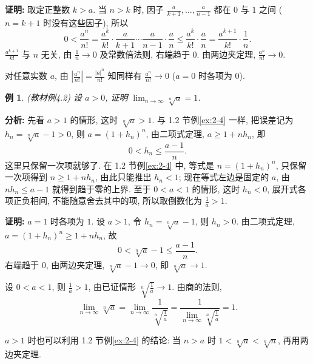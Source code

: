 \documentclass[UTF8,openany]{ctexbook}
\theoremstyle{chinesetextbook}
\newtheorem{example}{例}[section]
\newenvironment{cnproof}{\par\indent\textbf{证明:} \ignorespaces}{\par}
\begin{document}
\begin{cnproof}
取定正整数 $k>a$. 当 $n>k$ 时, 因子 $\displaystyle\frac a{k+1},\ldots,\frac a{n-1}$ 都在 $0$ 与 $1$ 之间 ($n=k+1$ 时没有这些因子), 所以
\[
0<\frac{a^n}{n!}=\frac{a^k}{k!}\cdot\frac a{k+1}\cdots\frac a{n-1}\cdot\frac an\le\frac{a^k}{k!}\cdot\frac an=\frac{a^{k+1}}{k!}\cdot\frac1n.
\]
$\displaystyle\frac{a^{k+1}}{k!}$ 与 $n$ 无关, 由 $\displaystyle\frac1n\to0$ 及常数倍法则, 右端趋于 $0$. 由两边夹定理, $\displaystyle\frac{a^n}{n!}\to0$.
\end{cnproof}
对任意实数 $a$, 由 $\displaystyle\left|\frac{a^n}{n!}\right|=\frac{|a|^n}{n!}$ 知同样有 $\displaystyle\frac{a^n}{n!}\to0$ ($a=0$ 时各项为 $0$).
\begin{example}\label{ex:4-2}
\textnormal{(教材例4.2)} 设 $a>0$, 证明 $\displaystyle\lim_{n\to\infty}\sqrt[n]a=1$.
\end{example}
\par\indent\textbf{分析:} 先看 $a>1$ 的情形, 这时 $\sqrt[n]a>1$. 与 1.2 节例\ref{ex:2-4} 一样, 把误差记为 $h_n=\sqrt[n]a-1>0$, 则 $a=(1+h_n)^n$, 由二项式定理, $a\ge1+nh_n$, 即
\[
0<h_n\le\frac{a-1}n.
\]
这里只保留一次项就够了. 在 1.2 节例\ref{ex:2-4} 中, 等式是 $n=(1+h_n)^n$, 只保留一次项得到 $n\ge1+nh_n$, 由此只能推出 $h_n<1$; 现在等式左边是固定的 $a$, 由 $nh_n\le a-1$ 就得到趋于零的上界. 至于 $0<a<1$ 的情形, 这时 $h_n<0$, 展开式各项正负相间, 不能随意舍去其中的项, 所以取倒数化为 $\displaystyle\frac1a>1$.
\begin{cnproof}
$a=1$ 时各项为 $1$. 设 $a>1$, 令 $h_n=\sqrt[n]a-1$, 则 $h_n>0$. 由二项式定理, $a=(1+h_n)^n\ge1+nh_n$, 故
\[
0<\sqrt[n]a-1\le\frac{a-1}n.
\]
右端趋于 $0$, 由两边夹定理, $\sqrt[n]a-1\to0$, 即 $\sqrt[n]a\to1$.

设 $0<a<1$, 则 $\displaystyle\frac1a>1$, 由已证情形 $\displaystyle\sqrt[n]{\frac1a}\to1$. 由商的法则,
\[
\lim_{n\to\infty}\sqrt[n]a=\lim_{n\to\infty}\frac1{\sqrt[n]{\frac1a}}=\frac1{\displaystyle\lim_{n\to\infty}\sqrt[n]{\frac1a}}=1.
\]
\end{cnproof}
$a>1$ 时也可以利用 1.2 节例\ref{ex:2-4} 的结论: 当 $n>a$ 时 $1<\sqrt[n]a<\sqrt[n]n$, 再用两边夹定理.
\end{document}
